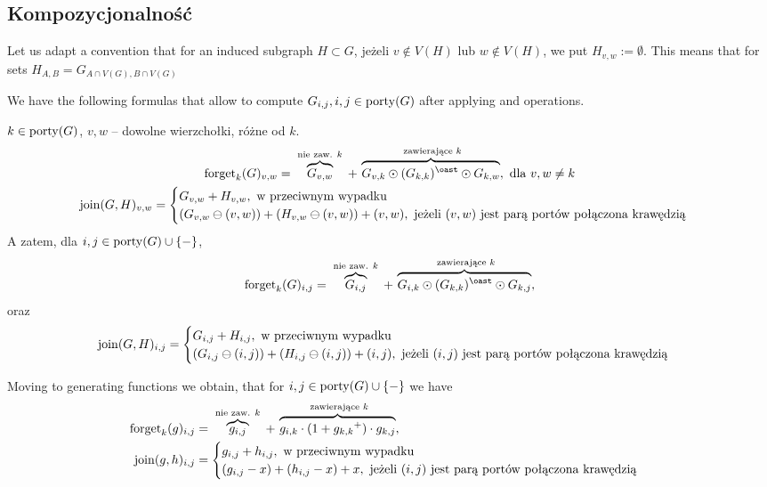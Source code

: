 \subsection{Kompozycjonalność}
\begin{df}
	Let us adapt a convention that for an induced subgraph $H\subset G$, jeżeli $v \notin V(H)$ lub $w \notin V(H)$, we put $H_{v, w} := \emptyset$. This means that for sets $H_{A,B} = G_{A \cap V(G), B \cap V(G)}$
\end{df}
We have the following formulas that allow to compute $G_{i, j}, i, j \in \operatorname{porty}(G)$ after applying \forget and \join operations.
\begin{lm}
	$k \in \operatorname{porty}(G)$, $v,w$ -- dowolne wierzchołki, różne od $k$.
	\begin{gather}
		\forget_k(G)_{v, w} = 
		\overbrace{G_{v,w}}^{\text{ nie zaw. $k$ }} \disjointsum \ \! \overbrace{G_{v, k} \odot (G_{k, k})^{\oast} \odot G_{k,w}}^{\text{ zawierające $k$}},
		\text{ dla } v,w\neq k
		\\
		\join(G, H)_{v, w} = 
		\begin{cases}
			G_{v, w} \disjointsum H_{v, w}, \text{ w przeciwnym wypadku}\\
			(G_{v, w} \ominus(v, w)) \disjointsum (H_{v, w} \ominus(v,w)) \disjointsum (v,w), \text{ jeżeli $(v, w)$ jest parą portów połączona krawędzią}
		\end{cases}
	\end{gather}
	A zatem, dla $i, j \in \operatorname{porty}(G) \cup \{ - \}$, 
	$$
		\forget_k(G)_{i, j} = \overbrace{G_{i,j}}^{\text{ nie zaw. $k$ }} \disjointsum \ \! \overbrace{G_{i, k} \odot (G_{k, k})^{\oast} \odot G_{k,j}}^{\text{ zawierające $k$}},
	$$
	oraz
	\[
		\mathrm{join}(G, H)_{i, j} = 
		\begin{cases}
			G_{i, j} + H_{i, j}, \text{ w przeciwnym wypadku}\\
			(G_{i, j} \ominus(i, j)) + (H_{i, j} \ominus(i,j)) + (i,j), \text{ jeżeli $(i, j)$ jest parą portów połączona krawędzią}
		\end{cases}
	\]
\end{lm}
Moving to generating functions we obtain, that for $i, j \in \operatorname{porty}(G) \cup \{ - \}$ we have
	\begin{align}
		\mathrm{forget}_k(g)_{i, j}& = 
			\overbrace{g_{i,j}}^{\text{ nie zaw. $k$ }} + \ \! \overbrace{g_{i, k} \cdot (1+{g_{k, k}}^+) \cdot g_{k,j}}^{\text{ zawierające $k$}},
		\\
		\mathrm{join}(g, h)_{i, j}& = 
			\begin{cases}
				g_{i, j} + h_{i, j}, \text{ w przeciwnym wypadku}\\
				(g_{i, j} - x) + (h_{i, j} - x) + x, \text{ jeżeli $(i,j )$ jest parą portów połączona krawędzią}
			\end{cases}
	\end{align}
